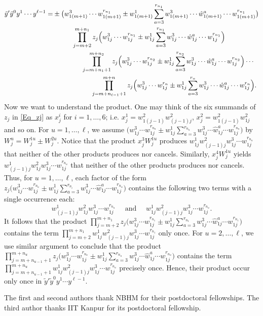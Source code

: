 \documentclass[12pt,oneside,reqno]{amsart}
\theoremstyle{plain}
\theoremstyle{definition}
\theoremstyle{remark}
\begin{document}
\pagebreak

\begin{align*}
\tilde{y}' \tilde{y}^0 y^1 \cdots y^{\ell-1} 
= & \pm \big(w^3_{1(m+1)} \cdots w^{r_{n_1}}_{1(m+1)} \pm w^1_{1(m+1)} \sum^{r_{n_1}}_{a=3} w^3_{1(m+1)} \cdots \hat{w}^a_{1(m+1)} \cdots w^{r_{n_1}}_{1(m+1)}\big)\\
& \hspace{1cm} \prod^{m+n_1}_{j=m+2} z_j \Big(w^3_{1j} \cdots w^{r_{n_1}}_{1j} \pm w^1_{1j} \sum^{r_{n_1}}_{a=3} w^3_{1j} \cdots \hat{w}^a_{1j} \cdots w^{r_{n_1}}_{1j}\Big)\\
& \hspace{1.5cm} \prod^{m+n_2}_{j=m+n_1 +1} z_j \Big(w^3_{1j} \cdots w^{r_{n_2}}_{1j} \pm w^1_{1j} \sum^{r_{n_2}}_{a=3} w^3_{1j} \cdots \hat{w}^a_{1j} \cdots w^{r_{n_2}}_{1j}\Big) \cdots \\
& \hspace{2cm} \prod^{m+n}_{j=m+n_{\ell-1} +1} z_j \Big(w^3_{1j} \cdots w^{r_{n}}_{1j} \pm w^1_{1j} \sum^{r_{n}}_{a=3} w^3_{1j} \cdots \hat{w}^a_{1j} \cdots w^{r_{n}}_{1j}\Big).
\end{align*}
Now we want to understand the product. One may think of the six summands of $z_j$ in \eqref{Eq_zj} as $x_j^i$ for $i=1, \dots, 6$; i.e. $x_j^1=w^2_{1(j-1)}w^2_{(j-1)j}$, $x_j^2=w^2_{1(j-1)}w^2_{1j}$ and so on. For $u=1,\ldots,\ell$, we assume $\big(w^3_{1j} \cdots w^{r_{n_u}}_{1j} \pm w^1_{1j} \displaystyle\sum^{r_{n_u}}_{a=3} w^3_{1j} \cdots \hat{w}^a_{1j} \cdots w^{r_{n_u}}_{1j}\big)$ by $W^u_j=W^{1u}_j \pm W^{2u}_j$. 
Notice that the product $x^3_j W^{1u}_j$ produces $w^1_{1j}w^2_{(j-1)j}w^3_{1j}\cdots w^{r_{n_u}}_{1j}$ that neither of the other products produces nor cancels. Similarly, $x^4_j W^{1u}_j$ yields $w^1_{(j-1)j}w^2_{1j}w^3_{1j} \cdots w^{r_{n_u}}_{1j}$ that neither of the other products produces nor cancels.
Thus, for $u=1,\ldots, \ell$, each factor of the form $z_j \Big(w^3_{1j} \cdots w^{r_{n_u}}_{1j} \pm w^1_{1j} \displaystyle\sum^{r_{n_i}}_{a=3} w^3_{1j} \cdots \hat{w}^a_{1j} \cdots w^{r_{n_u}}_{1j}\Big)$ contains the following two terms with a single occurrence each:
$$w^1_{(j-1)j}w^2_{1j}w^3_{1j} \cdots w^{r_{n_u}}_{1j} \quad \text{ and } \quad w^1_{1j}w^2_{(j-1)j}w^3_{1j}\cdots w^{r_{n_u}}_{1j}.$$ 
It follows that the product $ \displaystyle\prod^{m+n_1}_{j=m+2} z_j \Big(w^3_{1j} \cdots w^{r_{n_1}}_{1j} \pm w^1_{1j} \sum^{r_{n_1}}_{a=3} w^3_{1j} \cdots \hat{w}^a_{1j} \cdots w^{r_{n_1}}_{1j}\Big)$ contains the term $\displaystyle\prod^{m+n_1}_{j=m+2}w^1_{1j}w^2_{(j-1)j}w^3_{1j} \cdots w^{r_{n_1}}_{1j}$ only once. For $u= 2,\ldots, \ell$, we use similar argument to conclude that the product $ \displaystyle\prod^{m+n_u}_{j=m+n_{u-1}+1} z_j \Big(w^3_{1j} \cdots w^{r_{n_u}}_{1j} \pm w^1_{1j} \sum^{r_{n_u}}_{a=3} w^3_{1j} \cdots \hat{w}^a_{1j} \cdots w^{r_{n_u}}_{1j}\Big)$ contains the term $\displaystyle\prod^{m+n_u}_{j=m+n_{u-1}+1}w^1_{1j}w^2_{(j-1)j}w^3_{1j} \cdots w^{r_{n_u}}_{1j}$ precisely once. Hence, their product occur only once in $\tilde{y}' \tilde{y}^0 y^1 \cdots y^{\ell-1}$.








\vspace{1cm}

The first and second authors thank NBHM for their postdoctoral fellowships. The third author thanks IIT Kanpur for its postdoctoral fellowship.



\end{document}
